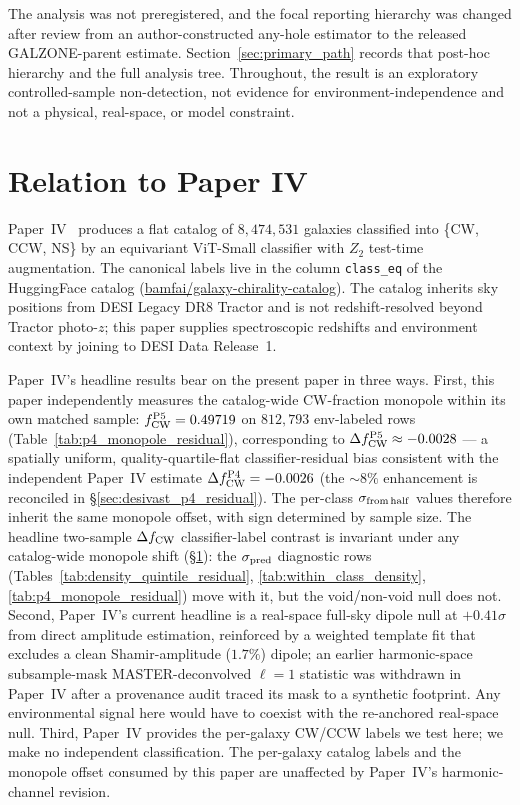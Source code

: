 \documentclass[twocolumn,linenumbers]{aastex702}
\begin{document}
The analysis was not preregistered, and the focal reporting hierarchy was
changed after review from an author-constructed any-hole estimator to the
released GALZONE-parent estimate. Section~\ref{sec:primary_path} records
that post-hoc hierarchy and the full analysis tree. Throughout, the
result is an exploratory controlled-sample non-detection, not evidence
for environment-independence and not a physical, real-space, or model
constraint.

\section{Relation to Paper IV}\label{sec:p4}

Paper~IV~\cite{golden_chirality_2026} produces a flat catalog of
$8{,}474{,}531$ galaxies classified into \{CW, CCW, NS\} by an
equivariant ViT-Small classifier with $Z_2$ test-time augmentation.
The canonical labels live in the column \texttt{class\_eq} of the
HuggingFace catalog
(\href{https://huggingface.co/datasets/bamfai/galaxy-chirality-catalog}%
{bamfai/galaxy-chirality-catalog}). The catalog inherits sky positions from
DESI Legacy DR8 Tractor and is not redshift-resolved beyond Tractor
photo-$z$; this paper supplies spectroscopic redshifts and environment
context by joining to DESI Data Release~1.

Paper~IV's headline results bear on the present paper in three ways.
First, this paper independently measures the catalog-wide CW-fraction
monopole within its own matched sample: $f_{\rm CW}^{\rm P5} =
0.49719$ on $812{,}793$ env-labeled rows
(Table~\ref{tab:p4_monopole_residual}), corresponding to
$\Delta f_{\rm CW}^{\rm P5} \approx -0.0028$ --- a spatially uniform,
quality-quartile-flat classifier-residual bias consistent with the
independent Paper~IV estimate $\Delta f_{\rm CW}^{\rm P4} = -0.0026$
(the ${\sim}8\%$ enhancement is reconciled in \S\ref{sec:desivast_p4_residual}).
The per-class $\sigma_{\rm from\,half}$ values therefore inherit the
same monopole offset, with sign determined by sample size. The
headline two-sample $\Delta f_{\rm CW}$ classifier-label contrast is
invariant under any catalog-wide monopole shift
(\S\ref{sec:p4}): the $\sigma_{\rm pred}$ diagnostic rows
(Tables~\ref{tab:density_quintile_residual},
\ref{tab:within_class_density}, \ref{tab:p4_monopole_residual}) move
with it, but the void/non-void null does not. Second,
Paper~IV's current headline is a real-space full-sky dipole
null at $+0.41\sigma$ from direct amplitude estimation,
reinforced by a weighted template fit that excludes a clean
Shamir-amplitude ($1.7\%$) dipole; an earlier harmonic-space
subsample-mask MASTER-deconvolved $\ell\!=\!1$ statistic was withdrawn
in Paper~IV after a provenance audit traced its mask to a
synthetic footprint. Any environmental signal
here would have to coexist with the re-anchored real-space null. Third,
Paper~IV provides
the per-galaxy CW/CCW labels we test here; we make no independent
classification. The per-galaxy catalog labels and the monopole offset
consumed by this paper are unaffected by Paper~IV's harmonic-channel
revision.
\end{document}
